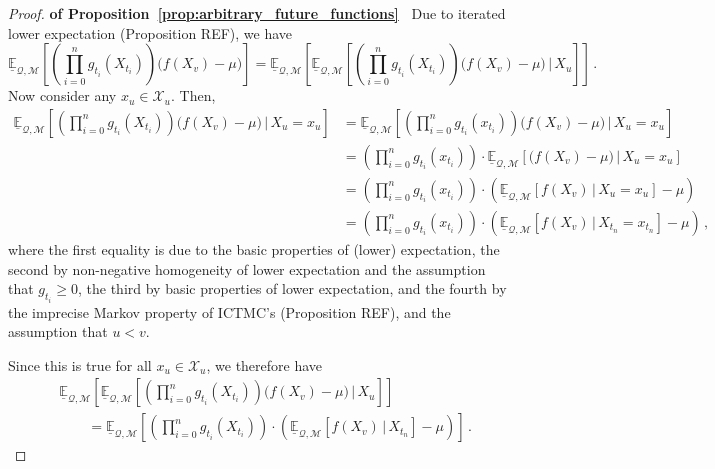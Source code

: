 \documentclass[twoside,11pt]{article}
\newcommand{\states}{\mathcal{X}}
\newcommand{\lexp}{\underline{\mathbb{E}}_{\rateset,\mathcal{M}}}
\newcommand{\rateset}{\mathcal{Q}}
\begin{document}
\begin{proof}{\bf of Proposition~\ref{prop:arbitrary_future_functions}~}
Due to iterated lower expectation (Proposition REF), we have
\begin{equation*}
\lexp\left[\left(\prod_{i=0}^n g_{t_i}(X_{t_i})\right)\bigl(f(X_v) - \mu\bigr)\right] = \lexp\left[\lexp\left[\left(\prod_{i=0}^n g_{t_i}(X_{t_i})\right)\bigl(f(X_v) - \mu\bigr)\,\bigl\vert\,X_u\right]\right]\,.
\end{equation*}
Now consider any $x_u\in\states_u$. Then,
\begin{align*}
\lexp\left[\left(\prod_{i=0}^n g_{t_i}(X_{t_i})\right)\bigl(f(X_v) - \mu\bigr)\,\bigl\vert\,X_u=x_u\right] &= \lexp\left[\left(\prod_{i=0}^n g_{t_i}(x_{t_i})\right)\bigl(f(X_v) - \mu\bigr)\,\bigl\vert\,X_u=x_u\right] \\
&= \left(\prod_{i=0}^n g_{t_i}(x_{t_i})\right)\cdot\lexp\left[\bigl(f(X_v) - \mu\bigr)\,\bigl\vert\,X_u=x_u\right] \\
&= \left(\prod_{i=0}^n g_{t_i}(x_{t_i})\right)\cdot\left(\lexp\left[f(X_v)\,\vert\,X_u=x_u\right] - \mu\right) \\
&= \left(\prod_{i=0}^n g_{t_i}(x_{t_i})\right)\cdot\left(\lexp\left[f(X_v)\,\vert\,X_{t_n}=x_{t_n}\right] - \mu\right)\,,
\end{align*}
where the first equality is due to the basic properties of (lower) expectation, the second by non-negative homogeneity of lower expectation and the assumption that $g_{t_i}\geq 0$, the third by basic properties of lower expectation, and the fourth by the imprecise Markov property of ICTMC's (Proposition REF), and the assumption that $u<v$.

Since this is true for all $x_u\in\states_u$, we therefore have
\begin{align*}
 &\lexp\left[\lexp\left[\left(\prod_{i=0}^n g_{t_i}(X_{t_i})\right)\bigl(f(X_v) - \mu\bigr)\,\bigl\vert\,X_u\right]\right] \\
 &\quad\quad= \lexp\left[\left(\prod_{i=0}^n g_{t_i}(X_{t_i})\right)\cdot\left(\lexp\left[f(X_v)\,\vert\,X_{t_n}\right] - \mu\right)\right]\,.
\end{align*}
\end{proof}
\end{document}
